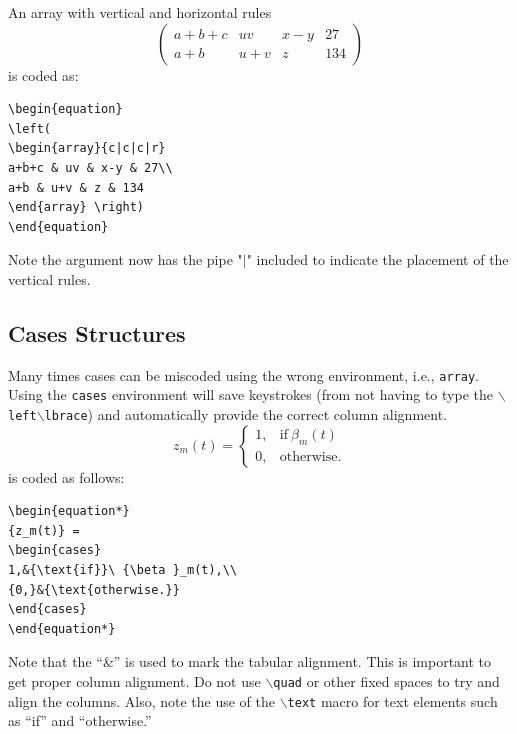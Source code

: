\documentclass[lettersize,journal]{IEEEtran}
\begin{document}
An array with vertical and horizontal rules
\begin{equation}
  \left( \begin{array}{c|c|c|r}
    a+b+c & uv  & x-y & 27  \\ \hline
    a+b   & u+v & z   & 134
  \end{array}\right)
\end{equation}
is coded as:
\begin{verbatim}
\begin{equation}
\left(
\begin{array}{c|c|c|r}
a+b+c & uv & x-y & 27\\
a+b & u+v & z & 134
\end{array} \right)
\end{equation}
\end{verbatim}
Note the argument now has the pipe "$\vert$" included to indicate the placement
of the vertical rules.

\subsection{Cases Structures}
Many times cases can be miscoded using the wrong environment, i.e.,
{\tt{array}}. Using the {\tt{cases}} environment will save keystrokes (from not
having to type the $\backslash${\tt{left}}$\backslash${\tt{lbrace}}) and
automatically provide the correct column alignment.
\begin{equation*}
  {z_m(t)} = \begin{cases}
    1,   & {\text{if}}\ {\beta }_m(t) \\
    {0,} & {\text{otherwise.}}
  \end{cases}
\end{equation*}
\noindent is coded as follows:
\begin{verbatim}
\begin{equation*}
{z_m(t)} = 
\begin{cases}
1,&{\text{if}}\ {\beta }_m(t),\\ 
{0,}&{\text{otherwise.}} 
\end{cases}
\end{equation*}
\end{verbatim}
\noindent Note that the ``\&'' is used to mark the tabular alignment. This is important to get  proper column alignment. Do not use $\backslash${\tt{quad}} or other fixed spaces to try and align the columns. Also, note the use of the $\backslash${\tt{text}} macro for text elements such as ``if'' and ``otherwise.''
\end{document}
